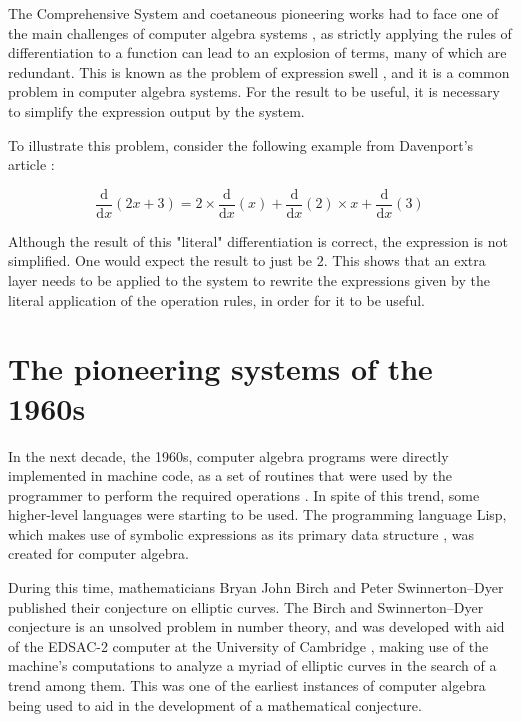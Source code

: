 The Comprehensive System and coetaneous pioneering works had to face one of the main challenges of computer algebra systems \parencite{davenport1994computer}, as strictly applying the rules of differentiation to a function can lead to an explosion of terms, many of which are redundant. This is known as the problem of expression swell \parencite{laue2019equivalence}, and it is a common problem in computer algebra systems. For the result to be useful, it is necessary to simplify the expression output by the system.

To illustrate this problem, consider the following example from Davenport's article \parencite{davenport1994computer}:

\begin{equation}
    \frac{\mathrm{d}}{\mathrm{d}x} \left( 2x + 3 \right) = 2 \times \frac{\mathrm{d}}{\mathrm{d}x} \left( x \right) + \frac{\mathrm{d}}{\mathrm{d}x} \left( 2 \right) \times x + \frac{\mathrm{d}}{\mathrm{d}x} \left( 3 \right)
\end{equation}

Although the result of this "literal" differentiation is correct, the expression is not simplified. One would expect the result to just be $2$. This shows that an extra layer needs to be applied to the system to rewrite the expressions given by the literal application of the operation rules, in order for it to be useful.

\section{The pioneering systems of the 1960s}\label{sec:the-pioneering-systems-of-the-1960s}

In the next decade, the 1960s, computer algebra programs were directly implemented in machine code, as a set of routines that were used by the programmer to perform the required operations \parencite{davenport1994computer}. In spite of this trend, some higher-level languages were starting to be used. The programming language Lisp, which makes use of symbolic expressions as its primary data structure \parencite{mccarthy1960recursive}, was created for computer algebra.

During this time, mathematicians Bryan John Birch and Peter Swinnerton--Dyer published their conjecture on elliptic curves. The Birch and Swinnerton--Dyer conjecture is an unsolved problem in number theory, and was developed with aid of the EDSAC-2 computer at the University of Cambridge \parencite{birch1965notes}, making use of the machine's computations to analyze a myriad of elliptic curves in the search of a trend among them. This was one of the earliest instances of computer algebra being used to aid in the development of a mathematical conjecture.

